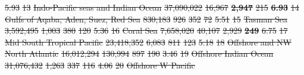 \documentclass[12pt,authoryear]{elsarticle}
\providecommand{\DIFdeltex}[1]{{\protect\color{red}\sout{#1}}}                      %
\providecommand{\DIFdelFL}[1]{\DIFdel{#1}} %
\providecommand{\DIFdel}[1]{\texorpdfstring{\DIFdeltex{#1}}{}} %
\begin{document}
\begin{table}[]
\DIFdelFL{5.93 }%
\DIFdelFL{13 }%
\DIFdelFL{Indo-Pacific seas and Indian Ocean  }%
\DIFdelFL{37,090,022 }%
\DIFdelFL{16,967 }%
\textbf{\DIFdelFL{2,947}} %
\DIFdelFL{215 }%
\textbf{\DIFdelFL{6.93}} %
\DIFdelFL{14 }%
\DIFdelFL{Gulfs of Aqaba, Aden, Suez, Red Sea }%
\DIFdelFL{830,183 }%
\DIFdelFL{926 }%
\DIFdelFL{352 }%
\DIFdelFL{72 }%
\DIFdelFL{5.51 }%
\DIFdelFL{15 }%
\DIFdelFL{Tasman Sea                          }%
\DIFdelFL{3,592,495 }%
\DIFdelFL{1,003 }%
\DIFdelFL{380 }%
\DIFdelFL{120 }%
\DIFdelFL{5.36 }%
\DIFdelFL{16 }%
\DIFdelFL{Coral Sea                           }%
\DIFdelFL{7,658,020 }%
\DIFdelFL{40,107 }%
\DIFdelFL{2,929 }%
\textbf{\DIFdelFL{249}} %
\DIFdelFL{6.75}%
\DIFdelFL{17 }%
\DIFdelFL{Mid South Tropical Pacific          }%
\DIFdelFL{23,418,352 }%
\DIFdelFL{6,083 }%
\DIFdelFL{811 }%
\DIFdelFL{123 }%
\DIFdelFL{5.18 }%
\DIFdelFL{18 }%
\DIFdelFL{Offshore and NW North Atlantic      }%
\DIFdelFL{16,012,294 }%
\DIFdelFL{130,994 }%
\DIFdelFL{897 }%
\DIFdelFL{190 }%
\DIFdelFL{3.46 }%
\DIFdelFL{19 }%
\DIFdelFL{Offshore Indian Ocean               }%
\DIFdelFL{31,076,432 }%
\DIFdelFL{1,263 }%
\DIFdelFL{337 }%
\DIFdelFL{116 }%
\DIFdelFL{4.06 }%
\DIFdelFL{20 }%
\DIFdelFL{Offshore W Pacific                  }%

\end{table}
\end{document}

